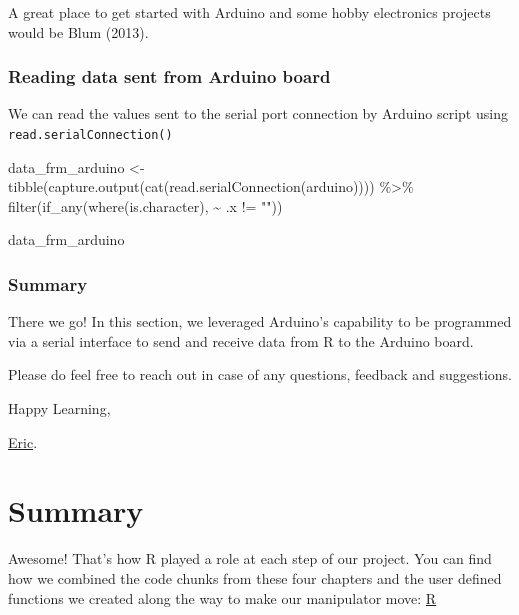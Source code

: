 \documentclass[
  letterpaper,
  DIV=11,
  numbers=noendperiod]{scrreprt}
\newenvironment{Shaded}{\begin{snugshade}}{\end{snugshade}}
\newcommand{\FunctionTok}[1]{\textcolor[rgb]{0.28,0.35,0.67}{#1}}
\newcommand{\NormalTok}[1]{\textcolor[rgb]{0.00,0.23,0.31}{#1}}
\newcommand{\OtherTok}[1]{\textcolor[rgb]{0.00,0.23,0.31}{#1}}
\newcommand{\SpecialCharTok}[1]{\textcolor[rgb]{0.37,0.37,0.37}{#1}}
\newcommand{\StringTok}[1]{\textcolor[rgb]{0.13,0.47,0.30}{#1}}
\begin{document}
A great place to get started with Arduino and some hobby electronics
projects would be Blum (2013).

\hypertarget{reading-data-sent-from-arduino-board}{%
\subsection{\texorpdfstring{\textbf{Reading data sent from Arduino
board}}{Reading data sent from Arduino board}}\label{reading-data-sent-from-arduino-board}}

We can read the values sent to the serial port connection by Arduino
script using \texttt{read.serialConnection()}

\begin{Shaded}
\begin{Highlighting}[]
\NormalTok{data\_frm\_arduino }\OtherTok{\textless{}{-}} \FunctionTok{tibble}\NormalTok{(}\FunctionTok{capture.output}\NormalTok{(}\FunctionTok{cat}\NormalTok{(}\FunctionTok{read.serialConnection}\NormalTok{(arduino)))) }\SpecialCharTok{\%\textgreater{}\%} 
  \FunctionTok{filter}\NormalTok{(}\FunctionTok{if\_any}\NormalTok{(}\FunctionTok{where}\NormalTok{(is.character), }\SpecialCharTok{\textasciitilde{}}\NormalTok{ .x }\SpecialCharTok{!=} \StringTok{""}\NormalTok{))}


\NormalTok{data\_frm\_arduino}
\end{Highlighting}
\end{Shaded}

\hypertarget{summary-2}{%
\subsection{Summary}\label{summary-2}}

There we go! In this section, we leveraged Arduino's capability to be
programmed via a serial interface to send and receive data from R to the
Arduino board.

Please do feel free to reach out in case of any questions, feedback and
suggestions.

Happy Learning,

\href{https://twitter.com/ericntay}{Eric}.

\hypertarget{summary-3}{%
\chapter{Summary}\label{summary-3}}

Awesome! That's how R played a role at each step of our project. You can
find how we combined the code chunks from these four chapters and the
user defined functions we created along the way to make our manipulator
move:
\href{https://github.com/R-icntay/rstudio_conf22_R_in_robotics/tree/main/R}{R}
\end{document}
